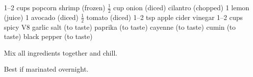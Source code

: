\dishtype{\apps}
\dishother{}
\begin{ingreds}
    1--2 cups popcorn shrimp (frozen)
    $\frac{1}{2}$ cup onion (diced)
    cilantro (chopped)
    1 lemon (juice)
    1 avocado (diced)
    $\frac{1}{2}$ tomato (diced)
    1--2 tsp apple cider vinegar
    1--2 cups spicy V8
    garlic salt (to taste)
    paprika (to taste)
    cayenne (to taste)
    cumin (to taste)
    black pepper (to taste)
\end{ingreds}
\begin{method}
    Mix all ingredients together and chill.\par
    Best if marinated overnight.
\end{method}